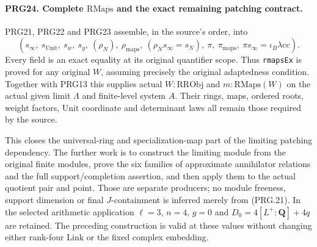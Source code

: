 \paragraph{PRG24. Complete \(\mathrm{RMaps}\) and the exact remaining patching contract.}
\label{claim:PRG24}
PRG21, PRG22 and PRG23 assemble, in the source's order, into
\[
 (s_\infty,\ s_{\mathrm{Unit}},\ s_w,\ s_y,\
       (\rho_N),\ \rho_{\mathrm{maps}},\
       (\rho_Ns_\infty=s_N),\ \pi,\ \pi_{\mathrm{maps}},\
       \pi s_\infty=\iota_B\lambda\mathrm{cc}).            \tag{PRG.21}
\]
Every field is an exact equality at its original quantifier scope.
Thus \texttt{rmapsEx} is proved for any original \(W\), assuming
precisely the original adaptedness condition. Together with
PRG13 this supplies actual \(W:\mathrm{RRObj}\) and
\(m:\mathrm{RMaps}(W)\) on the actual given limit \(\Lambda\)
and finite-level system \(A\). Their rings, maps, ordered roots,
weight factors, Unit coordinate and determinant laws all remain
those required by the source.

This closes the universal-ring and specialization-map part of
the limiting patching dependency. The further work is to construct
the limiting module from the original finite modules, prove the
six families of approximate annihilator relations and the full
support/completion assertion, and then apply them to the actual
quotient pair and point. Those are separate producers; no module
freeness, support dimension or final \(J\)-containment is inferred
merely from (PRG.21). In the selected arithmetic application
\(\ell=3\), \(n=4\), \(g=0\) and
\(D_0=4[L^+:\mathbf Q]+4q\) are retained. The preceding
construction is valid at these values without changing either
rank-four Link or the fixed complex embedding.
